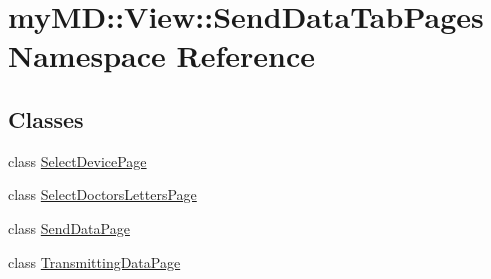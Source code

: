 \hypertarget{namespacemy_m_d_1_1_view_1_1_send_data_tab_pages}{
\section{my\-MD::View::Send\-Data\-Tab\-Pages Namespace Reference}
\label{dd/d83/namespacemy_m_d_1_1_view_1_1_send_data_tab_pages}
}


\subsection*{Classes}
\begin{CompactItemize}
\item 
class \hyperlink{classmy_m_d_1_1_view_1_1_send_data_tab_pages_1_1_select_device_page}{Select\-Device\-Page}
\item 
class \hyperlink{classmy_m_d_1_1_view_1_1_send_data_tab_pages_1_1_select_doctors_letters_page}{Select\-Doctors\-Letters\-Page}
\item 
class \hyperlink{classmy_m_d_1_1_view_1_1_send_data_tab_pages_1_1_send_data_page}{Send\-Data\-Page}
\item 
class \hyperlink{classmy_m_d_1_1_view_1_1_send_data_tab_pages_1_1_transmitting_data_page}{Transmitting\-Data\-Page}
\end{CompactItemize}
